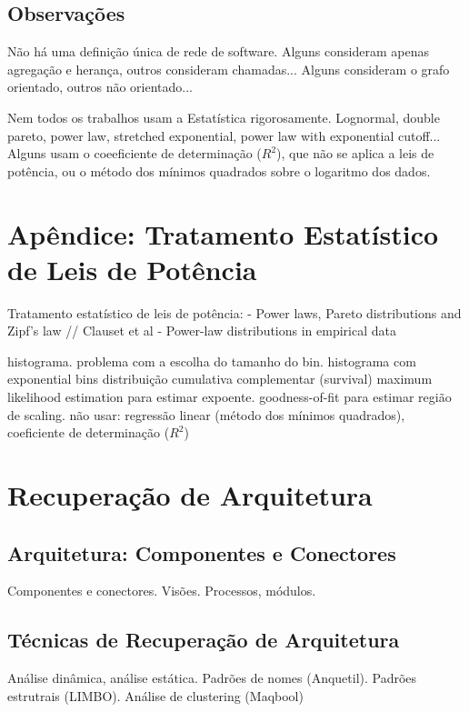 \documentclass{article}
\begin{document}
\subsection{Observações}

Não há uma definição única de rede de software. Alguns consideram apenas agregação e herança, outros consideram chamadas... Alguns consideram o grafo orientado, outros não orientado...

Nem todos os trabalhos usam a Estatística rigorosamente. Lognormal, double pareto, power law, stretched exponential, power law with exponential cutoff... Alguns usam o coeeficiente de determinação ($R^2$), que não se aplica a leis de potência, ou o método dos mínimos quadrados sobre o logaritmo dos dados.

\section{Apêndice: Tratamento Estatístico de Leis de Potência}

Tratamento estatístico de leis de potência:  \cite{Newman2005} - Power laws, Pareto distributions and Zipf's law   //   Clauset et al - Power-law distributions in empirical data \cite{Clauset2007}

histograma. problema com a escolha do tamanho do bin. histograma com exponential bins
distribuição cumulativa complementar (survival)
maximum likelihood estimation para estimar expoente.
goodness-of-fit para estimar região de scaling.
não usar: regressão linear (método dos mínimos quadrados), coeficiente de determinação ($R^2$)

\section{Recuperação de Arquitetura}

\subsection{Arquitetura: Componentes e Conectores}

Componentes e conectores.
Visões. Processos, módulos.

\subsection{Técnicas de Recuperação de Arquitetura}


Análise dinâmica, análise estática. Padrões de nomes (Anquetil). Padrões estrutrais (LIMBO). Análise de clustering (Maqbool)
\end{document}
